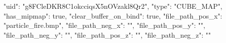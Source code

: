 {
    "uid": "g8FCleDKR8C1okcciqsX5nOVzakl8Qr2",
    "type": "CUBE_MAP",
    "has_mipmap": true,
    "clear_buffer_on_bind": true,
    "file_path_pos_x": "particle_fire.bmp",
    "file_path_neg_x": "",
    "file_path_pos_y": "",
    "file_path_neg_y": "",
    "file_path_pos_z": "",
    "file_path_neg_z": ""
}